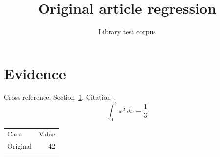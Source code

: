 \documentclass{article}
\begin{document}
\title{Original article regression}\author{Library test corpus}\maketitle
\section{Evidence}\label{sec:evidence}
Cross-reference: Section~\ref{sec:evidence}. Citation~\cite{test}.
\[\int_0^1 x^2\,dx=\frac13\]
\begin{tabular}{lr}Case & Value\\Original & 42\end{tabular}

\end{document}
